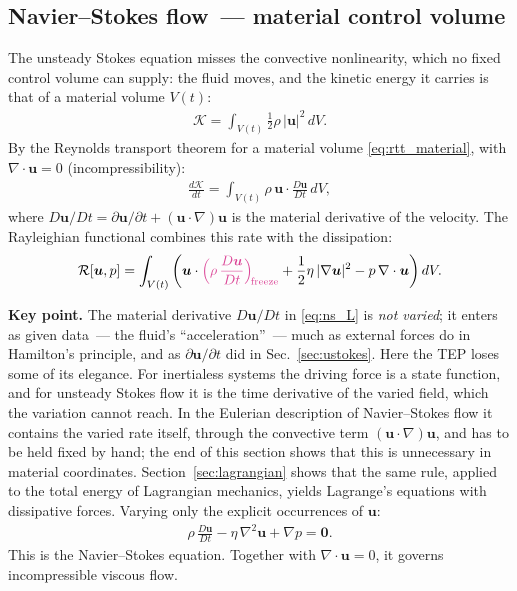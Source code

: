 \documentclass[aip,pof,reprint,amsmath,amssymb,longbibliography]{revtex4-2}
\begin{document}
\subsection{Navier--Stokes flow~--- material control volume}
\label{sec:ns}

The unsteady Stokes equation misses the convective nonlinearity, which no fixed control volume can supply: the fluid moves, and the kinetic energy it carries is that of a material volume $V(t)$:
\begin{align}
    \mathcal{K} = \int_{V(t)} \frac{1}{2}\rho\,|\boldsymbol{u}|^2 \, dV. \label{eq:K_material}
\end{align}
By the Reynolds transport theorem for a material volume \eqref{eq:rtt_material}, with $\nabla \cdot \boldsymbol{u} = 0$ (incompressibility):
\begin{align}
    \frac{d\mathcal{K}}{dt} = \int_{V(t)} \rho\, \boldsymbol{u} \cdot \frac{D\boldsymbol{u}}{Dt} \, dV, \label{eq:K_rate}
\end{align}
where $D\boldsymbol{u}/Dt = \partial\boldsymbol{u}/\partial t + (\boldsymbol{u} \cdot \nabla)\boldsymbol{u}$ is the material derivative of the velocity. The Rayleighian functional combines this rate with the dissipation:
\begin{align}
    \mathcal{R}[\boldsymbol{u}, p] = \int_{V(t)} \left( \boldsymbol{u} \cdot \textcolor{freezepink}{\Big( \rho\, \frac{D\boldsymbol{u}}{Dt} \Big)_{\!\text{freeze}}} + \frac{1}{2}\eta\,|\nabla \boldsymbol{u}|^2 - p\,\nabla \cdot \boldsymbol{u} \right) dV. \label{eq:ns_L}
\end{align}

\textbf{Key point.} The material derivative $D\boldsymbol{u}/Dt$ in \eqref{eq:ns_L} is \textit{not varied}; it enters as given data~--- the fluid's ``acceleration''~--- much as external forces do in Hamilton's principle, and as $\partial\boldsymbol{u}/\partial t$ did in Sec.~\ref{sec:ustokes}. Here the TEP loses some of its elegance. For inertialess systems the driving force is a state function, and for unsteady Stokes flow it is the time derivative of the varied field, which the variation cannot reach. In the Eulerian description of Navier--Stokes flow it contains the varied rate itself, through the convective term $(\boldsymbol{u}\cdot\nabla)\boldsymbol{u}$, and has to be held fixed by hand; the end of this section shows that this is unnecessary in material coordinates. Section~\ref{sec:lagrangian} shows that the same rule, applied to the total energy of Lagrangian mechanics, yields Lagrange's equations with dissipative forces. Varying only the explicit occurrences of $\boldsymbol{u}$:
\begin{align}
    \rho\,\frac{D\boldsymbol{u}}{Dt} - \eta\,\nabla^2 \boldsymbol{u} + \nabla p = \boldsymbol{0}. \label{eq:ns}
\end{align}
This is the Navier--Stokes equation. Together with $\nabla \cdot \boldsymbol{u} = 0$, it governs incompressible viscous flow.
\end{document}
